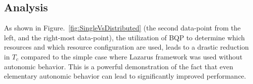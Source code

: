 \documentclass{acm_proc_article-sp}
\newcommand{\tc}{$T_c$ }
\newcommand{\jhanote}[1]{ {\textcolor{red} { ***Jha: #1 }}}
\newcommand{\yyenote}[1]{ {\textcolor{blue} { ***yye00: #1 }}}
\newcommand{\jhanote}[1]{}
\newcommand{\yyenote}[1]{}
\begin{document}
\begin{table}
\begin{center}
\vspace{0.2in}
\caption{Table showing  the selected configuration of the resources
  and the number of times a particular configuration is chosen, when 
  the decision is guided by BQP. Data in this table corresponds to
  RQA-BQP; the experiments are repeated ten times. As can be seen, 
  the use of BQP results in a varying choice of resource  configuration on  different machines.  In contrast, when BQP is not used, a fixed configuration
  is employed.}
\label{table:AllBQP}
\end{center}
\end{table}

\subsection{Analysis} 
As shown in Figure.~\ref{fig:SingleVsDistributed} (the second
data-point from the left, and the right-most data-point), the 
utilization of BQP to determine which resources and which
resource configuration are used, leads to a drastic 
reduction in \tc compared to the simple case where Lazarus
framework was used without autonomic behavior. This is 
a powerful demonstration of the fact that even elementary
autonomic behavior can lead to significantly improved 
performance.

\end{document}
